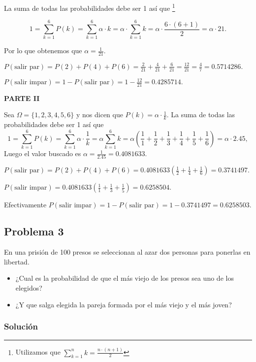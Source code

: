 \documentclass[
]{article}
\providecommand{\tightlist}{%
  \setlength{\itemsep}{0pt}\setlength{\parskip}{0pt}}
\begin{document}
La suma de todas las probabilidades debe ser 1 así que
\footnote{Utilizamos que
$\sum_{k=1}^n k=\frac{n\cdot (n+1)}{2}$ }

\[1=\sum_{k=1}^6 P(k)=\sum_{k=1}^6 \alpha \cdot k=
\alpha\cdot  \sum_{k=1}^6 k = \alpha \cdot \frac{6\cdot (6+1)}{2}=\alpha\cdot 21.\]

Por lo que obtenemos que \(\alpha=\frac{1}{21}.\)

\(P(\mbox{salir par})= P(2)+P(4)+P(6)=\frac{2}{21}+\frac{4}{21}+\frac{6}{21}=\frac{12}{21}=\frac{4}{7}=0.5714286.\)

\(P(\mbox{salir impar})= 1- P(\mbox{salir par})=1-\frac{12}{21}=0.4285714.\)

\textbf{PARTE II}

Sea \(\Omega=\{1,2,3,4,5,6\}\) y nos dicen que
\(P(k)= \alpha\cdot \frac{1}{k}\). La suma de todas las probabilidades
debe ser 1 así que \[
1=\sum_{k=1}^6 P(k)=\sum_{k=1}^6 \alpha \cdot \frac{1}{k}=
\alpha \sum_{k=1}^6 k = \alpha \left(\frac{1}{1}+\frac{1}{2}+\frac{1}{3}+\frac{1}{4}+\frac{1}{5}+\frac{1}{6}\right)=\alpha\cdot 2.45,
\] Luego el valor buscado es \(\alpha=\frac{1}{2.45}=0.4081633\).

\(P(\mbox{salir par})= P(2)+P(4)+P(6)=0.4081633\left(\frac{1}{2}+\frac{1}{4}+\frac{1}{6}\right)=0.3741497.\)

\(P(\mbox{salir impar})= 0.4081633\left(\frac{1}{1}+\frac{1}{3}+\frac{1}{5}\right)= 0.6258504.\)

Efectivamente
\(P(\mbox{salir impar})=1-P(\mbox{salir par})=1-0.3741497= 0.6258503.\)

\hypertarget{problema-3}{%
\subsection{Problema 3}\label{problema-3}}

En una prisión de 100 presos se seleccionan al azar dos personas para
ponerlas en libertad.

\begin{itemize}
\tightlist
\item
  ¿Cual es la probabilidad de que el más viejo de los presos sea uno de
  los elegidos?
\item
  ¿Y que salga elegida la pareja formada por el más viejo y el más
  joven?
\end{itemize}

\hypertarget{soluciuxf3n-3}{%
\subsubsection{Solución}\label{soluciuxf3n-3}}
\end{document}
